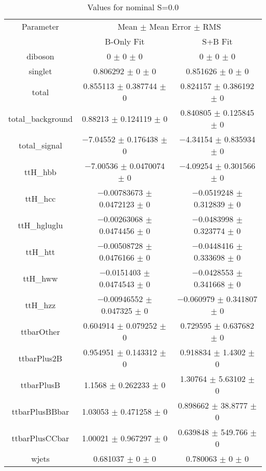\begin{table}
\centering
\caption{Values for nominal S=0.0}
\begin{tabular}{ccc}
\toprule
Parameter & \multicolumn{2}{c}{Mean $\pm$ Mean Error $\pm$ RMS}\\
 & B-Only Fit & S+B Fit\\
\midrule
diboson & \num{0} $\pm$ \num{0} $\pm$ \num{0} & \num{0} $\pm$ \num{0} $\pm$ \num{0}\\
singlet & \num{0.806292} $\pm$ \num{0} $\pm$ \num{0} & \num{0.851626} $\pm$ \num{0} $\pm$ \num{0}\\
total & \num{0.855113} $\pm$ \num{0.387744} $\pm$ \num{0} & \num{0.824157} $\pm$ \num{0.386192} $\pm$ \num{0}\\
total\_background & \num{0.88213} $\pm$ \num{0.124119} $\pm$ \num{0} & \num{0.840805} $\pm$ \num{0.125845} $\pm$ \num{0}\\
total\_signal & \num{-7.04552} $\pm$ \num{0.176438} $\pm$ \num{0} & \num{-4.34154} $\pm$ \num{0.835934} $\pm$ \num{0}\\
ttH\_hbb & \num{-7.00536} $\pm$ \num{0.0470074} $\pm$ \num{0} & \num{-4.09254} $\pm$ \num{0.301566} $\pm$ \num{0}\\
ttH\_hcc & \num{-0.00783673} $\pm$ \num{0.0472123} $\pm$ \num{0} & \num{-0.0519248} $\pm$ \num{0.312839} $\pm$ \num{0}\\
ttH\_hgluglu & \num{-0.00263068} $\pm$ \num{0.0474456} $\pm$ \num{0} & \num{-0.0483998} $\pm$ \num{0.323774} $\pm$ \num{0}\\
ttH\_htt & \num{-0.00508728} $\pm$ \num{0.0476166} $\pm$ \num{0} & \num{-0.0448416} $\pm$ \num{0.333698} $\pm$ \num{0}\\
ttH\_hww & \num{-0.0151403} $\pm$ \num{0.0474543} $\pm$ \num{0} & \num{-0.0428553} $\pm$ \num{0.341668} $\pm$ \num{0}\\
ttH\_hzz & \num{-0.00946552} $\pm$ \num{0.047325} $\pm$ \num{0} & \num{-0.060979} $\pm$ \num{0.341807} $\pm$ \num{0}\\
ttbarOther & \num{0.604914} $\pm$ \num{0.079252} $\pm$ \num{0} & \num{0.729595} $\pm$ \num{0.637682} $\pm$ \num{0}\\
ttbarPlus2B & \num{0.954951} $\pm$ \num{0.143312} $\pm$ \num{0} & \num{0.918834} $\pm$ \num{1.4302} $\pm$ \num{0}\\
ttbarPlusB & \num{1.1568} $\pm$ \num{0.262233} $\pm$ \num{0} & \num{1.30764} $\pm$ \num{5.63102} $\pm$ \num{0}\\
ttbarPlusBBbar & \num{1.03053} $\pm$ \num{0.471258} $\pm$ \num{0} & \num{0.898662} $\pm$ \num{38.8777} $\pm$ \num{0}\\
ttbarPlusCCbar & \num{1.00021} $\pm$ \num{0.967297} $\pm$ \num{0} & \num{0.639848} $\pm$ \num{549.766} $\pm$ \num{0}\\
wjets & \num{0.681037} $\pm$ \num{0} $\pm$ \num{0} & \num{0.780063} $\pm$ \num{0} $\pm$ \num{0}\\
\bottomrule
\end{tabular}
\end{table}